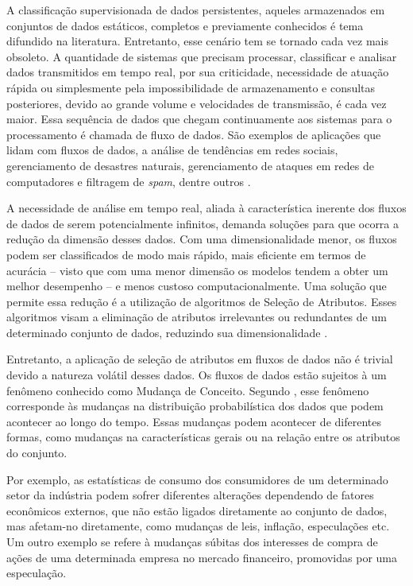 A classificação supervisionada de dados persistentes, aqueles armazenados
em conjuntos de dados estáticos, completos e previamente conhecidos é tema difundido na literatura. Entretanto, esse cenário tem se tornado cada vez mais obsoleto. A quantidade de sistemas que precisam processar, classificar e analisar dados transmitidos em tempo real, por sua criticidade, necessidade de atuação rápida ou simplesmente pela impossibilidade de armazenamento e consultas posteriores, devido ao grande volume e velocidades de 
transmissão, é cada vez maior. Essa sequência de dados que chegam continuamente aos sistemas para o processamento é chamada de fluxo de dados. São exemplos de aplicações que lidam com fluxos de dados, a análise de tendências em redes sociais, gerenciamento de desastres naturais, gerenciamento de ataques em redes de computadores
e filtragem de \textit{spam}, dentre outros \cite{Gradvohl2014}.

A necessidade de análise em tempo real, aliada à característica inerente dos fluxos de dados de serem potencialmente infinitos, demanda soluções para que ocorra a redução da dimensão desses dados. Com uma dimensionalidade menor, os fluxos podem ser classificados de modo mais rápido, mais eficiente em termos de acurácia -- visto que com uma menor dimensão os modelos tendem a obter um melhor desempenho -- e menos custoso computacionalmente. Uma solução que permite essa redução é a utilização de algoritmos de Seleção de Atributos. Esses algoritmos visam a eliminação de atributos irrelevantes ou redundantes de um determinado conjunto de dados, reduzindo sua dimensionalidade \cite{Barddal2017}.   

Entretanto, a aplicação de seleção de atributos em fluxos de dados não é trivial devido a natureza volátil desses dados. Os fluxos de dados estão sujeitos à um fenômeno conhecido como Mudança de Conceito. Segundo , esse fenômeno corresponde às mudanças na distribuição probabilística dos dados que podem acontecer ao longo do tempo. Essas mudanças podem acontecer de diferentes formas, como mudanças na características gerais ou na relação entre os atributos do conjunto. 

Por exemplo, as estatísticas de consumo dos consumidores de um determinado setor da indústria podem sofrer diferentes alterações dependendo de fatores econômicos externos, que não estão ligados diretamente ao conjunto de dados, mas afetam-no diretamente, como mudanças de leis, inflação, especulações etc. Um outro exemplo se refere à mudanças súbitas dos interesses de compra de ações de uma determinada empresa no mercado financeiro, promovidas por uma especulação. 


